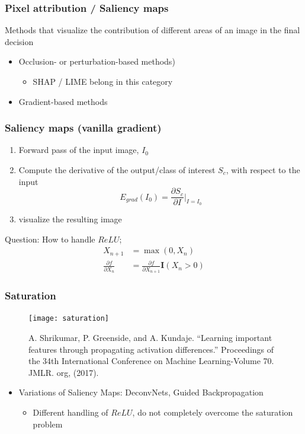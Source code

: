 \begin{frame}
  \frametitle{Pixel attribution / Saliency maps}
  Methods that visualize the contribution of different areas of an image in the
  final decision
  \begin{itemize}
  \item Occlusion- or perturbation-based methods)
    \begin{itemize}
    \item SHAP / LIME belong in this category
    \end{itemize}
  \item Gradient-based methods
  \end{itemize}
\end{frame}

\begin{frame}
  \frametitle{Saliency maps (vanilla gradient)}
  \begin{enumerate}
  \item Forward pass of the input image, $I_0$
  \item Compute the derivative of the output/class of interest $S_c$, with
    respect to the input
    \begin{equation*}
      E_{grad}(I_0) = \frac{\partial S_c}{\partial I}\Bigr|_{I=I_0}
    \end{equation*}
  \item visualize the resulting image
  \end{enumerate}
  Question: How to handle $ReLU$;
  \begin{align*}
    X_{n+1} &= \max(0, X_n)\\
    \frac{\partial f}{\partial X_n} &= \frac{\partial f}{\partial X_{n+1}}\mathbf{I}(X_n > 0)
  \end{align*}
\end{frame}

\begin{frame}
  \frametitle{Saturation}
  \begin{figure}
    \texttt{[image: saturation]}
    \caption{\footnotesize A. Shrikumar, P. Greenside, and A.
      Kundaje. ``Learning important features through propagating activation
      differences.'' Proceedings of the 34th International Conference on
      Machine Learning-Volume 70. JMLR. org, (2017).}
  \end{figure}
  \begin{itemize}
  \item Variations of Saliency Maps: DeconvNets, Guided Backpropagation
    \begin{itemize}
    \item Different handling of $ReLU$, do not completely overcome the
      saturation problem
    \end{itemize}
  \end{itemize}
\end{frame}

